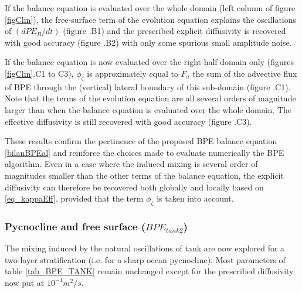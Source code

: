 If the balance equation is evaluated over the whole domain (left column of figure \ref{figClin}), the free-surface term of the evolution equation explains the oscillations of $(dPE_B/dt)$ (figure .B1) and the prescribed explicit diffusivity is recovered with good accuracy (figure .B2) with only some spurious small amplitude noise.

If the balance equation is now evaluated over the right half domain only (figures \ref{figClin}.C1 to C3), $\phi_{\zeta}$ is approximately equal to $F_a$ the sum of the advective flux of BPE through the (vertical) lateral boundary of this sub-domain (figure .C1). Note that the terms of the evolution equation are all several orders of magnitude larger than when the balance equation is evaluated over the whole domain. The effective diffusivity is still recovered with good accuracy (figure .C3).

These results confirm the pertinence of the proposed BPE balance equation \ref{bilanBPEal} and reinforce the choices made to evaluate numerically the BPE algorithm. Even in a case where the induced mixing is several order of magnitudes smaller than the other terms of the balance equation, the explicit diffusivity can therefore be recovered both globally and locally based on \ref{eq_kappaEff}, provided that the term $\phi_{\zeta}$ is taken into account.

\subsubsection{Pycnocline and free surface ({$BPE_{tank2}$})}
The mixing induced by the natural oscillations of tank are now explored for a two-layer stratification (i.e. for a sharp ocean pycnocline). Most parameters of table \ref{tab_BPE_TANK} remain unchanged except for the prescribed diffusivity now put at $10^{-4}m^2/s$.

